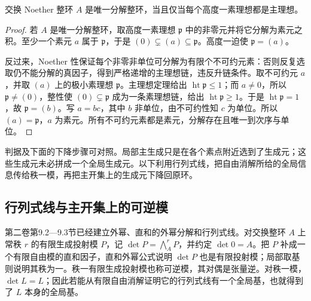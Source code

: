 \begin{proposition}\label{b3:prop:height-one-ufd-criterion}
	交换 Noether 整环 \(A\) 是唯一分解整环，当且仅当每个高度一素理想都是主理想。
\end{proposition}
\begin{proof}
	若 \(A\) 是唯一分解整环，取高度一素理想 \(\mathfrak p\) 中的非零元并将它分解为素元之积。至少一个素元 \(a\) 属于 \(\mathfrak p\)，于是 \((0)\subsetneq(a)\subseteq\mathfrak p\)。高度一迫使 \(\mathfrak p=(a)\)。

	反过来，Noether 性保证每个非零非单位可分解为有限个不可约元素：否则反复选取仍不能分解的真因子，得到严格递增的主理想链，违反升链条件。取不可约元 \(a\)，并取 \((a)\) 上的极小素理想 \(\mathfrak p\)。主理想定理给出 \(\operatorname{ht}\mathfrak p\le1\)；而 \(a\ne0\)，所以 \(\mathfrak p\ne(0)\)，整性使 \((0)\subsetneq\mathfrak p\) 成为一条素理想链，给出 \(\operatorname{ht}\mathfrak p\ge1\)。于是 \(\operatorname{ht}\mathfrak p=1\)，故 \(\mathfrak p=(b)\)。写 \(a=bc\)，其中 \(b\) 非单位，由不可约性知 \(c\) 为单位。所以 \((a)=\mathfrak p\)，\(a\) 为素元。所有不可约元素都是素元，分解存在且唯一到次序与单位。
\end{proof}

判据及下面的下降步骤可对照\cite[Theorems 20.1--20.2, pp. 161--162]{Matsumura1989CommutativeRingTheory}。局部主生成只是在各个素点附近选到了生成元；这些生成元未必拼成一个全局生成元。以下利用行列式线，把自由消解所给的全局信息传给秩一模，再把主开集上的生成元下降回原环。

\subsection{行列式线与主开集上的可逆模}
\label{b3:subsec:1804:02}

第二卷第9.2—9.3节已经建立外幂、直和的外幂分解和行列式线。对交换整环 \(A\) 上常秩 \(r\) 的有限生成投射模 \(P\)，记 \(\det P=\bigwedge_A^rP\)，并约定 \(\det0=A\)。把 \(P\) 补成一个有限自由模的直和因子，直和外幂公式说明 \(\det P\) 也是有限投射模；局部取基则说明其秩为一。秩一有限生成投射模也称可逆模，其对偶是张量逆。对秩一模，\(\det L=L\)；因此若能从有限自由消解证明它的行列式线有一个全局基，也就得到了 \(L\) 本身的全局基。

